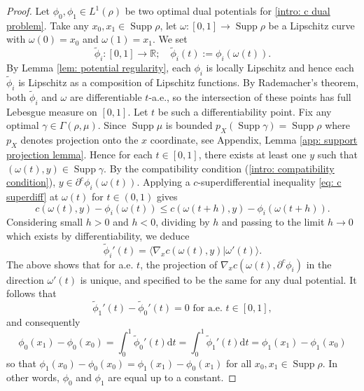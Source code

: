 \documentclass[11pt, oneside, titlepage]{book}
\theoremstyle{plain}
\theoremstyle{definition}
\newcommand{\R}{\mathbb{R}}
\newcommand{\di}{\mathrm{d}}
\DeclareMathOperator{\supp}{Supp}
\begin{document}
\begin{proof}
Let $\phi_0, \phi_1 \in L^1(\rho)$ be two optimal dual potentials for \eqref{intro: c dual problem}. Take any $x_0, x_1 \in \supp \rho$, let $\omega : [0, 1] \to \supp \rho$ be a Lipschitz curve with $\omega(0) = x_0$ and $\omega(1) = x_1$. We set
 \begin{equation*}
     \tilde\phi_i : [0, 1] \to \R; \quad\tilde\phi_i(t) := \phi_i(\omega(t)).
 \end{equation*}
By Lemma \ref{lem: potential regularity}, each $\phi_i$ is locally Lipschitz and hence each $\tilde\phi_i$ is Lipschitz as a composition of Lipschitz functions. By Rademacher's theorem, both $\tilde \phi_i$ and $\omega$ are differentiable $t$-a.e., so the intersection of these points has full Lebesgue measure on $[0, 1]$. Let $t$ be such a differentiability point.
Fix any optimal $\gamma \in \Gamma(\rho, \mu)$. Since $\supp \mu$ is bounded $p_X( \supp \gamma) = \supp \rho$ where $p_X$ denotes projection onto the $x$ coordinate, see Appendix, Lemma \ref{app: support projection lemma}. Hence for each $t \in [0, 1]$, there exists at least one $y$ such that $(\omega(t), y) \in \supp \gamma$. By the compatibility condition (\ref{intro: compatibility condition}), $y \in \partial^c \phi_i(\omega(t))$. Applying a $c$-superdifferential inequality \eqref{eq: c superdiff} at $\omega(t)$ for $t \in (0, 1)$ gives
\begin{equation*}
    c(\omega(t), y) - \phi_i(\omega(t)) \leq c(\omega(t+h), y) - \phi_i(\omega(t+h)).
\end{equation*}
Considering small $h>0$ and $h<0$, dividing by $h$ and passing to the limit $h \to 0$ which exists by differentiability, we deduce
\begin{equation*}
    \tilde\phi_i'(t) = \langle \nabla_x c(\omega(t), y) | \omega'(t)\rangle.
\end{equation*}
The above shows that for a.e. $t$, the projection of $\nabla_x c(\omega(t), \partial^c \phi_i )$ in the direction $\omega'(t)$ is unique, and specified to be the same for any dual potential. It follows that
\begin{equation*}
    \tilde\phi_1'(t) - \tilde\phi_0'(t) = 0 \text{ for a.e. } t \in [0, 1],
\end{equation*}
and consequently
\begin{equation*}
    \phi_0(x_1) - \phi_0(x_0) = \int_0^1 \tilde\phi_0'(t) \di t = \int_0^1 \tilde\phi_1'(t) \di t = \phi_1(x_1) - \phi_1(x_0)
\end{equation*}
so that $\phi_1(x_0) - \phi_0(x_0) = \phi_1(x_1) - \phi_0(x_1)$ for all $x_0, x_1 \in \supp \rho$. In other words, $\phi_0$ and $\phi_1$ are equal up to a constant.
\end{proof}
\end{document}
